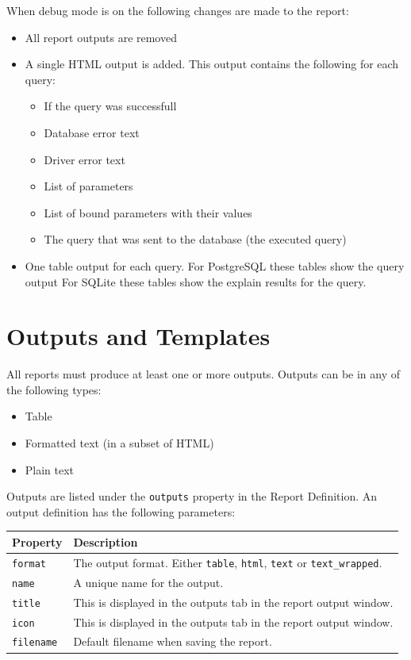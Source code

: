 \documentclass[a4paper,10pt]{book}
\begin{document}
When debug mode is on the following changes are made to the report:
\begin{itemize}
\item All report outputs are removed
\item A single HTML output is added. This output contains the following for each query:
\begin{itemize}
\item If the query was successfull
\item Database error text
\item Driver error text
\item List of parameters
\item List of bound parameters with their values
\item The query that was sent to the database (the executed query)
\end{itemize}
\item One table output for each query. For PostgreSQL these tables show the query output For SQLite these tables show the explain results for the query.
\end{itemize}


\chapter{Outputs and Templates}
All reports must produce at least one or more outputs. Outputs can be in any of the following types:
\begin{itemize}
\item Table
\item Formatted text (in a subset of HTML)
\item Plain text
\end{itemize}

Outputs are listed under the \verb|outputs| property in the Report Definition. An output definition has the following parameters:

\begin{tabular}{p{2.5cm} l}
\hline
\textbf{Property} & \textbf{Description} \\
\hline
\verb|format| & The output format. Either \verb|table|, \verb|html|, \verb|text| or \verb|text_wrapped|.\\
\verb|name| & A unique name for the output.\\
\verb|title| & This is displayed in the outputs tab in the report output window.\\
\verb|icon| & This is displayed in the outputs tab in the report output window.\\
\verb|filename| & Default filename when saving the report.\\
\hline
\end{tabular}
\end{document}
